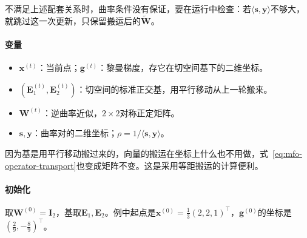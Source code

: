 不满足上述配套关系时，曲率条件没有保证，要在运行中检查：若$\langle\bm{s},\bm{y}\rangle$不够大，就跳过这一次更新，只保留搬运后的$\widetilde{\bm{W}}$。

\paragraph{变量}
\begin{itemize}
 \item $\bm{x}^{(t)}$：当前点；$\bm{g}^{(t)}$：黎曼梯度，存它在切空间基下的二维坐标。
 \item $(\bm{E}_1^{(t)},\bm{E}_2^{(t)})$：切空间的标准正交基，用平行移动从上一轮搬来。
 \item $\bm{W}^{(t)}$：逆曲率近似，$2\times2$对称正定矩阵。
 \item $\bm{s},\bm{y}$：曲率对的二维坐标；$\rho=1/\langle\bm{s},\bm{y}\rangle$。
\end{itemize}

因为基是用平行移动搬过来的，向量的搬运在坐标上什么也不用做，式~\eqref{eq:mfo-operator-transport}也变成矩阵不变。这是采用等距搬运的计算便利。

\paragraph{初始化}
取$\bm{W}^{(0)}=\bm{I}_2$，基取$\bm{E}_1,\bm{E}_2$。例中起点是$\bm{x}^{(0)}=\tfrac13(2,2,1)^\top$，$\bm{g}^{(0)}$的坐标是$(\tfrac29,-\tfrac89)^\top$。

